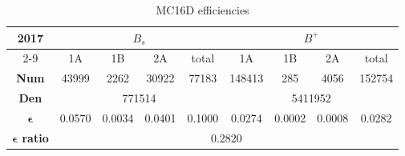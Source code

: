 \begin{table}[h]
\centering
\begin{tabular}{|c|cccccccc|}
\hline
\multirow{2}{*}{2017}                  & \multicolumn{4}{c|}{$B_s$}                                                                                            & \multicolumn{4}{c|}{$B^+$}                                                                       \\ \cline{2-9} 
                                       & \multicolumn{1}{c|}{1A}     & \multicolumn{1}{c|}{1B}     & \multicolumn{1}{c|}{2A}     & \multicolumn{1}{c|}{total}  & \multicolumn{1}{c|}{1A}     & \multicolumn{1}{c|}{1B}     & \multicolumn{1}{c|}{2A}     & total  \\ \hline
\textbf{Num}                           & \multicolumn{1}{c|}{43999}  & \multicolumn{1}{c|}{2262}   & \multicolumn{1}{c|}{30922}  & \multicolumn{1}{c|}{77183}  & \multicolumn{1}{c|}{148413} & \multicolumn{1}{c|}{285}    & \multicolumn{1}{c|}{4056}   & 152754 \\ \hline
\textbf{Den}                           & \multicolumn{4}{c|}{771514}                                                                                           & \multicolumn{4}{c|}{5411952}                                                                     \\ \hline
$\boldsymbol{\epsilon}$                & \multicolumn{1}{c|}{0.0570} & \multicolumn{1}{c|}{0.0034} & \multicolumn{1}{c|}{0.0401} & \multicolumn{1}{c|}{0.1000} & \multicolumn{1}{c|}{0.0274} & \multicolumn{1}{c|}{0.0002} & \multicolumn{1}{c|}{0.0008} & 0.0282 \\ \hline
\textbf{$\boldsymbol{\epsilon}$ ratio} & \multicolumn{8}{c|}{0.2820}                                                                                                                                                                                               \\ \hline
\end{tabular}
\caption{MC16D efficiencies}
\label{table::efficiencies MC16D}
\end{table}

